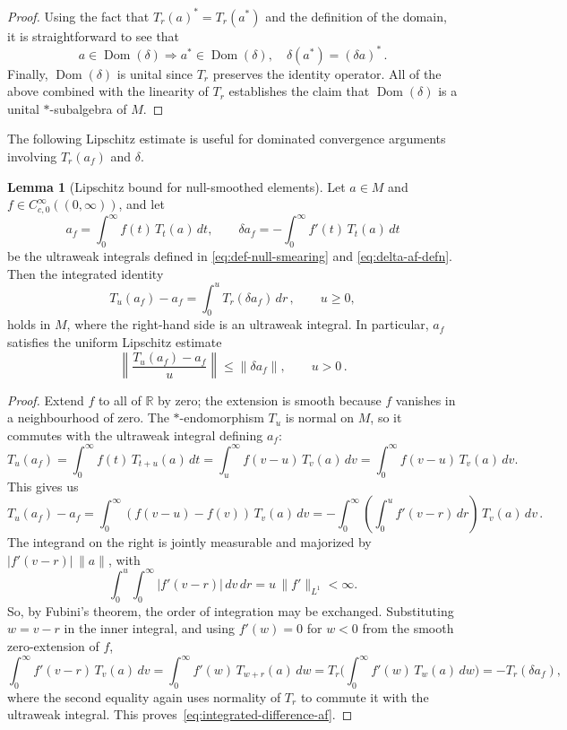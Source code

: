 \documentclass[11pt,a4paper]{article}
\theoremstyle{plain}
\numberwithin{theorem}{section}
\theoremstyle{definition}
\newtheorem{lemma}[theorem]{Lemma}
\newcommand{\?}{\overset{?}{=}}
\newcommand{\lb}{\left (}
\newcommand{\rb}{\right )}
\newcommand{\I}{\infty}
\DeclareMathOperator{\Dom}{Dom}
\begin{document}
\begin{appendix}
\begin{proof}
Using the fact that $T_r(a)^*=T_r(a^*)$ and the definition of the domain, it is straightforward to see that
\begin{equation*}
    a\in \Dom(\delta) \Rightarrow a^*\in \Dom(\delta), \quad \delta(a^*)=(\delta a)^*\,.
\end{equation*}
Finally, $\Dom(\delta)$ is unital since $T_r$ preserves the identity operator. All of the above combined with the linearity of $T_r$ establishes the claim that $\Dom(\delta)$ is a unital $*$-subalgebra of $M$.
\end{proof}

The following Lipschitz estimate is useful for dominated convergence arguments involving $T_r(a_f)$ and $\delta$.
\begin{lemma}[Lipschitz bound for null-smoothed elements]
\label{lem:lipschitz-af}
Let $a\in M$ and $f\in C_{c,0}^\infty((0,\I))$, and let
\[
  a_f=\int_0^\I f(t)\,T_t(a)\,dt,\qquad
  \delta a_f=-\int_0^\I f'(t)\,T_t(a)\,dt
\]
be the ultraweak integrals defined in \eqref{eq:def-null-smearing} and \eqref{eq:delta-af-defn}.  Then the
integrated identity
\begin{equation}
\label{eq:integrated-difference-af}
  T_u(a_f)-a_f=\int_0^u T_r(\delta a_f)\,dr\,,\qquad u\ge 0,
\end{equation}
holds in $M$, where the right-hand side is an ultraweak integral.  In particular, $a_f$
satisfies the uniform Lipschitz estimate
\begin{equation}
\label{eq:lipschitz-af-quotient}
  \left\|\frac{T_u(a_f)-a_f}{u}\right\|\le\|\delta a_f\|,\qquad u>0\,.
\end{equation}
\end{lemma}

\begin{proof}
Extend $f$ to all of $\mathbb R$ by zero; the extension is smooth because $f$ vanishes in a neighbourhood of zero.  
The $*$-endomorphism $T_u$ is normal on $M$, so it commutes with the ultraweak integral defining $a_f$:
\begin{equation*}
  T_u(a_f)=\int_0^\I f(t)\,T_{t+u}(a)\,dt=\int_u^\I f(v-u)\,T_{v}(a)\,dv
  =\int_0^\I f(v-u)\,T_{v}(a)\,dv.
\end{equation*}
This gives us
\begin{equation*}
  T_u(a_f)-a_f
  =\int_0^\I (f(v-u)-f(v))\,T_{v}(a)\,dv
  =-\int_0^\I\!\! \lb\int_0^u f'(v-r)\,dr \rb\,T_{v}(a)\,dv\,.
\end{equation*}
The integrand on the right is jointly measurable and majorized by
$|f'(v-r)|\,\|a\|$, with
\[
    \int_0^u \int_0^\I|f'(v-r)|\,dv\,dr=u\,\|f'\|_{L^1}<\I.
\]
So, by Fubini's theorem, the order of integration may be exchanged.  Substituting $w=v-r$ in the inner integral, and using $f'(w)=0$ for $w<0$ from the smooth zero-extension of $f$,
\begin{equation*}
  \int_0^\I f'(v-r)\,T_{v}(a)\,dv
  =\int_0^\I f'(w)\,T_{w+r}(a)\,dw
  =T_r\!\biggl(\int_0^\I f'(w)\,T_w(a)\,dw\biggr)
  =-T_r(\delta a_f),
\end{equation*}
where the second equality again uses normality of $T_r$ to commute it with the ultraweak
integral.  This proves~\eqref{eq:integrated-difference-af}.


\end{proof}
\end{appendix}
\end{document}
